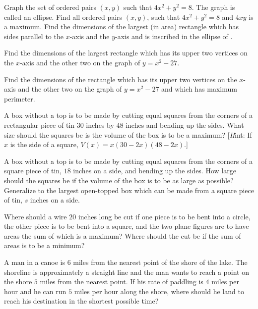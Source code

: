 \begin{exercises}
\begin{exenum}
\sx
{}
Graph the set of ordered pairs $(x,y)$ such that
$4x^2 + y^2 = 8$.  The graph is called an ellipse.
\sx
Find all ordered pairs $(x,y)$, such that $4x^2 + y^2 = 8$
and $4xy$ is a maximum.
\sx
Find the dimensions of the largest (in area) rectangle which
has sides parallel to the $x$-axis and the $y$-axis and is
inscribed in the ellipse of .
\end{exenum}

Find the dimensions of the largest rectangle which has its upper
two vertices on the $x$-axis and the other two on the graph of
$y = x^2 - 27$.

Find the dimensions of the rectangle which has its upper two vertices
on the $x$-axis and the other two on the graph of $y = x^2 - 27$
and which has maximum perimeter.

A box without a top is to be made by cutting equal squares from the
corners of a rectangular piece of tin $30$ inches by $48$ inches and
bending up the sides.  What size should the squares be is the volume
of the box is to be a maximum?  [{\emph Hint:} If $x$ is the side
of a square, $V(x) = x(30-2x)(48-2x)$.]

\begin{exenum}
\sx
{}
A box without a top is to be made by cutting equal squares from
the corners of a square piece of tin, $18$ inches on a side,
and bending up the sides.  How large should the squares be
if the volume of the box is to be as large as possible?
\sx
Generalize  to the largest open-topped box which
can be made from a square piece of tin, $s$ inches on a side.
\end{exenum}

\begin{exenum}
\sx
Where should a wire $20$ inches long be cut if one piece is to be
bent into a circle, the other piece is to be bent into a square,
and the two plane figures are to have areas the sum of which
is a maximum?
\sx
Where should the cut be if the sum of areas is to be a minimum?
\end{exenum}

A man in a canoe is $6$ miles from the nearest point of the shore
of the lake.  The shoreline is approximately a straight line and the man wants
to reach a point on the shore $5$ miles from the nearest point.
If his rate of paddling is $4$ miles per hour and he can run $5$
miles per hour along the shore, where should he land to reach his
destination in the shortest possible time?


\end{exercises}
